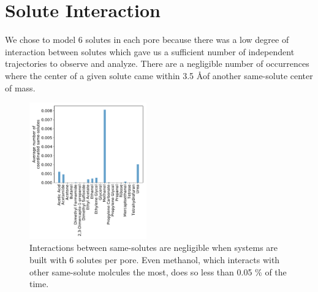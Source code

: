 \documentclass{article}
\begin{document}
  \section{Solute Interaction}\label{section:solute_interaction}
  
  We chose to model 6 solutes in each pore because there was a low degree of 
  interaction between solutes which gave us a sufficient number of independent 
  trajectories to observe and analyze. There are a negligible number of occurrences
  where the center of a given solute came within 3.5 \AA of another same-solute
  center of mass.
  
  \begin{figure}[!htb]
  \centering
  \includegraphics[width=0.45\textwidth]{solute_interaction.pdf}
  \caption{Interactions between same-solutes are negligible when systems are 
  built with 6 solutes per pore. Even methanol, which interacts with other same-solute
  molcules the most, does so less than 0.05 \% of the time.}\label{fig:solute_interation}
  \end{figure}
  
\end{document}
